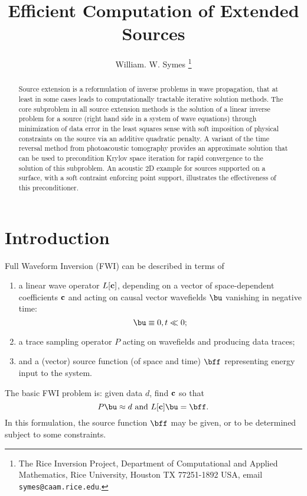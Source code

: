 \title{Efficient Computation of Extended Sources}
\author{William. W. Symes \thanks{The Rice Inversion Project,
Department of Computational and Applied Mathematics, Rice University,
Houston TX 77251-1892 USA, email {\tt symes@caam.rice.edu}.}}



\maketitle
\begin{abstract}
Source extension is a reformulation of inverse problems in wave propagation, that at least in some cases leads to computationally tractable iterative solution methods. The core subproblem in all source extension methods is the solution of a linear inverse problem for a source (right hand side in a system of wave equations) through minimization of data error in the least squares sense with soft imposition of physical constraints on the source via an additive quadratic penalty. A variant of the time reversal method from photoacoustic tomography provides an approximate solution that can be used to precondition Krylov space iteration for rapid convergence to the solution of this subproblem. An acoustic 2D example for sources supported on a surface, with a soft contraint enforcing point support, illustrates the effectiveness of this preconditioner.
\end{abstract}


\section{Introduction}
Full Waveform Inversion (FWI) can be described in terms of 
\begin{enumerate}
\item a linear wave operator $L[{\bf c}]$, depending on a vector of
  space-dependent coefficients ${\bf c}$ and acting on causal vector wavefields $\bu$ vanishing in negative time:
\begin{equation}
\label{eqn:init}
\bu \equiv 0, t \ll 0; 
\end{equation}
\item a trace sampling operator $P$ acting on wavefields and producing data traces;
\item and a (vector) source function (of space and time) $\bff$ representing energy input to the system. 
\end{enumerate}
The basic FWI problem is: given data $d$, find ${\bf c}$ so that 
\begin{equation}
\label{eqn:fwi}
P\bu \approx d \mbox{ and } L[\bf{c}]\bu = \bff.
\end{equation}
In this formulation, the source function $\bff$ may be given, or
to be determined subject to some constraints.

